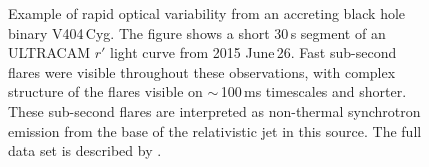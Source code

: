 \documentclass{pasa}%
\begin{document}





\begin{figure}
\centering
{}
\caption{Example of rapid optical variability from an accreting black hole binary V404\,Cyg. The figure shows a short 30\,s segment of an ULTRACAM $r'$ light curve from 2015 June\,26. Fast sub-second flares were visible throughout these observations, with complex structure of the flares visible on $\sim$\,100\,ms timescales and shorter. These sub-second flares are interpreted as non-thermal synchrotron emission from the base of the relativistic jet in this source. The full data set is described by \citet{gandhi16}.}
\label{fig:rapid_variability}
\end{figure}
\end{document}
